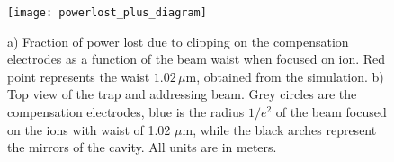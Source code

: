 \begin{figure}
       \centering
         \texttt{[image: powerlost\_plus\_diagram]}
         \caption{a) Fraction of power lost due to clipping on the compensation electrodes as a function of the beam waist when focused on ion. Red point represents the waist $1.02\,\mu$m, obtained from the simulation. b) Top view of the trap and addressing beam. Grey circles are the compensation electrodes, blue is the radius $1/e^2$ of the beam focused on the ions with waist of 1.02 $\mu$m, while the black arches represent the mirrors of the cavity. All units are in meters.}
         \label{lossesplot}
 \end{figure}

%
%


